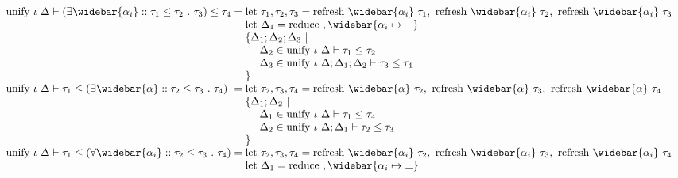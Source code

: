 \documentclass[manuscript]{acmart}
\begin{document}
\begin{figure*}[h]
\[\begin{array}{l @{} l}
      \text{unify } \iota\ \Delta \vdash
      (\exists \widebar{\alpha_i} :: \tau_1 \leq \tau_2\ .\ \tau_3)
      \leq 
      \tau_4
      &{} = 
      \begin{array}[t]{@{} l}
        \text{let } \tau_1, \tau_2, \tau_3 = 
        \text{refresh } \widebar{\alpha_i}\ \tau_1,\ 
        \text{refresh } \widebar{\alpha_i}\ \tau_2,\ 
        \text{refresh } \widebar{\alpha_i}\ \tau_3
        \\
        \text{let } \Delta_1 = \text{reduce}\ , \widebar{\alpha_i \mapsto \top}
        \\
        \{\Delta_1;\Delta_2;\Delta_3\ |
        \\ 
        \ \ \ \ \Delta_2 \in \text{unify } \iota\ \Delta \vdash \tau_1 \leq \tau_2
        \\
        \ \ \ \ \Delta_3 \in \text{unify } \iota\ \Delta;\Delta_1;\Delta_2 \vdash \tau_3 \leq \tau_4
        \\
        \}
      \end{array}
      \\
      \text{unify } \iota\ \Delta \vdash
      \tau_1
      \leq 
      (\exists \widebar{\alpha} :: \tau_2 \leq \tau_3\ .\ \tau_4)
      &{} = 
      \begin{array}[t]{@{} l}
        \text{let } \tau_2, \tau_3, \tau_4 = 
        \text{refresh } \widebar{\alpha}\ \tau_2,\ 
        \text{refresh } \widebar{\alpha}\ \tau_3,\ 
        \text{refresh } \widebar{\alpha}\ \tau_4
        \\
        \{\Delta_1;\Delta_2\ |
        \\ 
        \ \ \ \ \Delta_1 \in \text{unify } \iota\ \Delta \vdash \tau_1 \leq \tau_4
        \\
        \ \ \ \ \Delta_2 \in \text{unify } \iota\ \Delta;\Delta_1 \vdash \tau_2 \leq \tau_3
        \\
        \}
      \end{array}
      \\
      \text{unify } \iota\ \Delta \vdash
      \tau_1
      \leq 
      (\forall \widebar{\alpha_i} :: \tau_2 \leq \tau_3\ .\ \tau_4)
      &{} = 
      \begin{array}[t]{@{} l}
        \text{let } \tau_2, \tau_3, \tau_4 = 
        \text{refresh } \widebar{\alpha_i}\ \tau_2,\ 
        \text{refresh } \widebar{\alpha_i}\ \tau_3,\ 
        \text{refresh } \widebar{\alpha_i}\ \tau_4
        \\
        \text{let } \Delta_1 = \text{reduce}\ , \widebar{\alpha_i \mapsto \bot}
        \\

\end{array}
\end{array}\]
\end{figure*}
\end{document}
